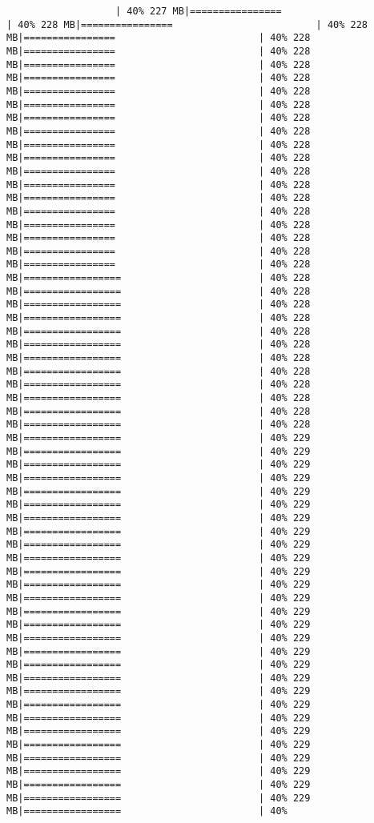 \documentclass[
]{article}
\begin{document}
\begin{verbatim}
                   | 40% 227 MB|================                         | 40% 228 MB|================                         | 40% 228 MB|================                         | 40% 228 MB|================                         | 40% 228 MB|================                         | 40% 228 MB|================                         | 40% 228 MB|================                         | 40% 228 MB|================                         | 40% 228 MB|================                         | 40% 228 MB|================                         | 40% 228 MB|================                         | 40% 228 MB|================                         | 40% 228 MB|================                         | 40% 228 MB|================                         | 40% 228 MB|================                         | 40% 228 MB|================                         | 40% 228 MB|================                         | 40% 228 MB|================                         | 40% 228 MB|================                         | 40% 228 MB|================                         | 40% 228 MB|=================                        | 40% 228 MB|=================                        | 40% 228 MB|=================                        | 40% 228 MB|=================                        | 40% 228 MB|=================                        | 40% 228 MB|=================                        | 40% 228 MB|=================                        | 40% 228 MB|=================                        | 40% 228 MB|=================                        | 40% 228 MB|=================                        | 40% 228 MB|=================                        | 40% 228 MB|=================                        | 40% 228 MB|=================                        | 40% 229 MB|=================                        | 40% 229 MB|=================                        | 40% 229 MB|=================                        | 40% 229 MB|=================                        | 40% 229 MB|=================                        | 40% 229 MB|=================                        | 40% 229 MB|=================                        | 40% 229 MB|=================                        | 40% 229 MB|=================                        | 40% 229 MB|=================                        | 40% 229 MB|=================                        | 40% 229 MB|=================                        | 40% 229 MB|=================                        | 40% 229 MB|=================                        | 40% 229 MB|=================                        | 40% 229 MB|=================                        | 40% 229 MB|=================                        | 40% 229 MB|=================                        | 40% 229 MB|=================                        | 40% 229 MB|=================                        | 40% 229 MB|=================                        | 40% 229 MB|=================                        | 40% 229 MB|=================                        | 40% 229 MB|=================                        | 40% 229 MB|=================                        | 40% 229 MB|=================                        | 40% 229 MB|=================                        | 40% 229 MB|=================                        | 40% 
\end{verbatim}
\end{document}
